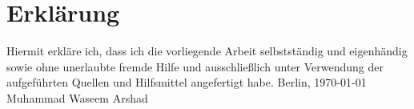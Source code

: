 \chapter*{Erkl{\"a}rung}
Hiermit erkl{\"a}re ich, dass ich die vorliegende Arbeit selbstständig und eigenh{\"a}ndig sowie ohne unerlaubte fremde Hilfe und ausschlie{\ss}lich unter Verwendung der aufgef{\"u}hrten Quellen und Hilfsmittel angefertigt habe.
\newline
\newline
Berlin, \today %
\newline
\newline
\newline
\newline
\newline
Muhammad Waseem Arshad

